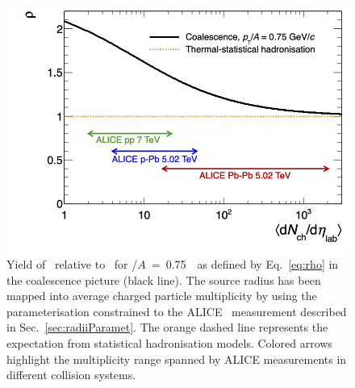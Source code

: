 \documentclass[%
 reprint,
 amsmath,amssymb,
 aps,
]{revtex4-1}
\begin{document}
\begin{figure}[!h]
	\begin{center}
		\includegraphics[width=\columnwidth]{RhoTritiumOver3HeliumVsMulti.png}
		\caption{Yield of \tritium~relative to \hethree~for \pt/$A$~=~0.75~\GeVc~as defined by Eq.~\ref{eq:rho} in the coalescence picture (black line). The source radius has been mapped into average charged particle multiplicity by using the parameterisation constrained to the ALICE \btwo~measurement described in Sec.~\ref{sec:radiiParamet}. The orange dashed line represents the expectation from statistical hadronisation models. Colored arrows highlight the multiplicity range spanned by ALICE measurements in different collision systems.}
		\label{fig:sourceVolume}
	\end{center}
\end{figure}
\end{document}
